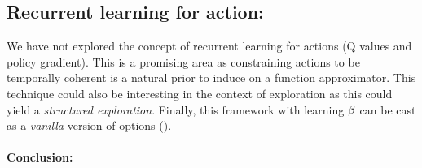 \subsection{Recurrent learning for action:} We have not explored the concept of recurrent learning for actions (Q values and policy gradient). This is a promising area as constraining actions to be temporally coherent is a natural prior to induce on a function approximator. This technique could also be interesting in the context of exploration as this could yield a \emph{structured exploration}. Finally, this framework with learning $\beta$ can be cast as a \emph{vanilla} version of options (\cite{sutton1999between}). 


\paragraph{Conclusion:}





 